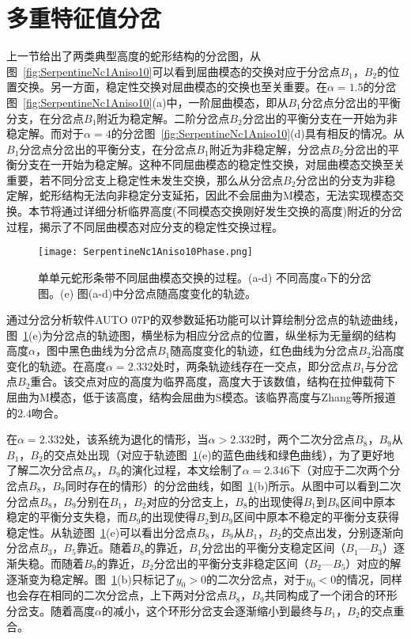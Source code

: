 \section{多重特征值分岔}
上一节给出了两类典型高度的蛇形结构的分岔图，从图~\ref{fig:SerpentineNc1Aniso10}可以看到屈曲模态的交换对应于分岔点$B_1$，$B_2$的位置交换。另一方面，稳定性交换对屈曲模态的交换也至关重要。在$\alpha=1.5$的分岔图~\ref{fig:SerpentineNc1Aniso10}(a)中，一阶屈曲模态，即从$B_1$分岔点分岔出的平衡分支，在分岔点$B_1$附近为稳定解。二阶分岔点$B_2$分岔出的平衡分支在一开始为非稳定解。而对于$\alpha=4$的分岔图~\ref{fig:SerpentineNc1Aniso10}(d)具有相反的情况。从$B_1$分岔点分岔出的平衡分支，在分岔点$B_1$附近为非稳定解，分岔点$B_2$分岔出的平衡分支在一开始为稳定解。这种不同屈曲模态的稳定性交换，对屈曲模态交换至关重要，若不同分岔支上稳定性未发生交换，那么从分岔点$B_2$分岔出的分支为非稳定解，蛇形结构无法向非稳定分支延拓，因此不会屈曲为M模态，无法实现模态交换。本节将通过详细分析临界高度(不同模态交换刚好发生交换的高度)附近的分岔过程，揭示了不同屈曲模态对应分支的稳定性交换过程。
\begin{figure}
	\centering
	\texttt{[image: SerpentineNc1Aniso10Phase.png]}
	\caption{单单元蛇形条带不同屈曲模态交换的过程。(a-d) 不同高度$\alpha$下的分岔图。(e) 图(a-d)中分岔点随高度变化的轨迹。}
	\label{fig:SerpentineNc1Aniso10Phase}
\end{figure}

通过分岔分析软件AUTO 07P\cite{doedel2007auto}的双参数延拓功能可以计算绘制分岔点的轨迹曲线，图~\ref{fig:SerpentineNc1Aniso10Phase}(e)为分岔点的轨迹图，横坐标为相应分岔点的位置，纵坐标为无量纲的结构高度$\alpha$，图中黑色曲线为分岔点$B_1$随高度变化的轨迹，红色曲线为分岔点$B_2$沿高度变化的轨迹。在高度$\alpha=2.332$处时，两条轨迹线存在一交点，即分岔点$B_1$与分岔点$B_2$重合。该交点对应的高度为临界高度，高度大于该数值，结构在拉伸载荷下屈曲为M模态，低于该高度，结构会屈曲为S模态。该临界高度与Zhang等\cite{zhang2013buckling}所报道的$2.4$吻合。

在$\alpha=2.332$处，该系统为退化的情形，当$\alpha>2.332$时，两个二次分岔点$B_8$，$B_9$从$B_1$，$B_2$的交点处出现（对应于轨迹图~\ref{fig:SerpentineNc1Aniso10Phase}(e)的蓝色曲线和绿色曲线），为了更好地了解二次分岔点$B_8$，$B_9$的演化过程，本文绘制了$\alpha=2.346$下（对应于二次两个分岔点$B_8$，$B_9$同时存在的情形）的分岔曲线，如图~\ref{fig:SerpentineNc1Aniso10Phase}(b)所示。从图中可以看到二次分岔点$B_8$，$B_9$分别在$B_1$，$B_2$对应的分岔支上，$B_8$的出现使得$B_1$到$B_8$区间中原本稳定的平衡分支失稳，而$B_9$的出现使得$B_2$到$B_9$区间中原本不稳定的平衡分支获得稳定性。从轨迹图~\ref{fig:SerpentineNc1Aniso10Phase}(e)可以看出分岔点$B_8$，$B_9$从$B_1$，$B_2$的交点出发，分别逐渐向分岔点$B_3$，$B_5$靠近。随着$B_8$的靠近，$B_1$分岔出的平衡分支稳定区间（$B_1$—$B_3$）逐渐失稳。而随着$B_9$的靠近，$B_2$分岔出的平衡分支非稳定区间（$B_2$—$B_5$）对应的解逐渐变为稳定解。图~\ref{fig:SerpentineNc1Aniso10Phase}(b)只标记了$y_0>0$的二次分岔点，对于$y_0<0$的情况，同样也会存在相同的二次分岔点，上下两对分岔点$B_8$，$B_9$共同构成了一个闭合的环形分岔支。随着高度$\alpha$的减小，这个环形分岔支会逐渐缩小到最终与$B_1$，$B_2$的交点重合。

